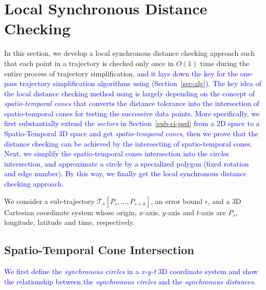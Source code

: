 \section{Local Synchronous Distance Checking}
\label{sec-localcheck}


In this section, we develop a local synchronous distance checking approach such that each point in a trajectory is checked only once in $O(1)$ time during the entire process of trajectory simplification, \textcolor{blue}{and it lays down the key for the one-pass trajectory simplification algorithms using \sed (Section~\ref{sec-alg}).}
\textcolor{blue}{The key idea of the local distance checking method using \sed is largely depending on the concept of \emph{spatio-temporal cones} that converts the \sed distance tolerance into the intersection of spatio-temporal cones for testing the successive data points.}
\textcolor{blue}{More specifically, we first substantially extend the \textit{sectors} in Section~\ref{sub-ci-ped} from a 2D space to a Spatio-Temporal 3D space and get \emph{spatio-temporal cones}, then we prove that the \sed distance checking can be achieved by the intersecting of spatio-temporal cones.}
\textcolor{blue}{Next, we simplify the spatio-temporal cones intersection into the circles intersection, and  approximate a circle by a specialized polygon (fixed rotation and edge number). By this way, we finally get the local synchronous distance checking approach.}


We consider a sub-trajectory $\dddot{\mathcal{T}}_s[P_s, \ldots, P_{s+k}]$, an error bound $\epsilon$, and a 3D Cartesian coordinate system whose origin, $x$-axis, $y$-axis and $t$-axis  are $P_s$, longitude, latitude and time, respectively.

\subsection{Spatio-Temporal Cone Intersection}

\textcolor{blue}{We first define the \textit{synchronous circles} in a \emph{x-y-t} 3D coordinate system and show the relationship between the \textit{synchronous circles} and the \textit{synchronous distances}.}

